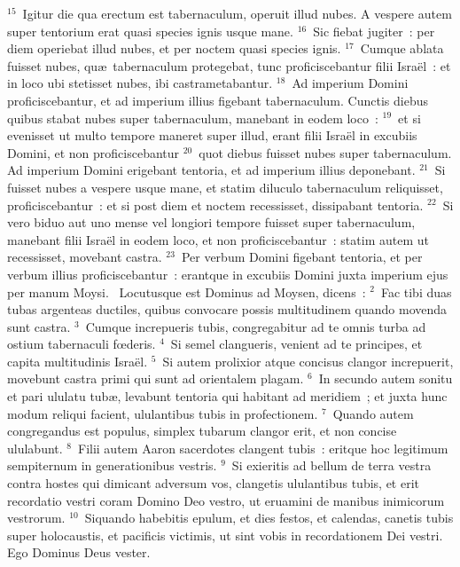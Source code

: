 ${}^{15}$~Igitur die qua erectum est tabernaculum, operuit illud nubes. A vespere autem super tentorium erat quasi species ignis usque mane.
${}^{16}$~Sic fiebat jugiter~: per diem operiebat illud nubes, et per noctem quasi species ignis.
${}^{17}$~Cumque ablata fuisset nubes, qu\ae\ tabernaculum protegebat, tunc proficiscebantur filii Isra\"el~: et in loco ubi stetisset nubes, ibi castrametabantur.
${}^{18}$~Ad imperium Domini proficiscebantur, et ad imperium illius figebant tabernaculum. Cunctis diebus quibus stabat nubes super tabernaculum, manebant in eodem loco~:
${}^{19}$~et si evenisset ut multo tempore maneret super illud, erant filii Isra\"el in excubiis Domini, et non proficiscebantur
${}^{20}$~quot diebus fuisset nubes super tabernaculum. Ad imperium Domini erigebant tentoria, et ad imperium illius deponebant.
${}^{21}$~Si fuisset nubes a vespere usque mane, et statim diluculo tabernaculum reliquisset, proficiscebantur~: et si post diem et noctem recessisset, dissipabant tentoria.
${}^{22}$~Si vero biduo aut uno mense vel longiori tempore fuisset super tabernaculum, manebant filii Isra\"el in eodem loco, et non proficiscebantur~: statim autem ut recessisset, movebant castra.
${}^{23}$~Per verbum Domini figebant tentoria, et per verbum illius proficiscebantur~: erantque in excubiis Domini juxta imperium ejus per manum Moysi.
~\lettrine[lines=10,image=true,loversize=0.05,lraise=-0.03]{L}{}ocutusque est Dominus ad Moysen, dicens~:
${}^{2}$~Fac tibi duas tubas argenteas ductiles, quibus convocare possis multitudinem quando movenda sunt castra.
${}^{3}$~Cumque increpueris tubis, congregabitur ad te omnis turba ad ostium tabernaculi fœderis.
${}^{4}$~Si semel clangueris, venient ad te principes, et capita multitudinis Isra\"el.
${}^{5}$~Si autem prolixior atque concisus clangor increpuerit, movebunt castra primi qui sunt ad orientalem plagam.
${}^{6}$~In secundo autem sonitu et pari ululatu tub\ae , levabunt tentoria qui habitant ad meridiem~; et juxta hunc modum reliqui facient, ululantibus tubis in profectionem.
${}^{7}$~Quando autem congregandus est populus, simplex tubarum clangor erit, et non concise ululabunt.
${}^{8}$~Filii autem Aaron sacerdotes clangent tubis~: eritque hoc legitimum sempiternum in generationibus vestris.
${}^{9}$~Si exieritis ad bellum de terra vestra contra hostes qui dimicant adversum vos, clangetis ululantibus tubis, et erit recordatio vestri coram Domino Deo vestro, ut eruamini de manibus inimicorum vestrorum.
${}^{10}$~Siquando habebitis epulum, et dies festos, et calendas, canetis tubis super holocaustis, et pacificis victimis, ut sint vobis in recordationem Dei vestri. Ego Dominus Deus vester.


